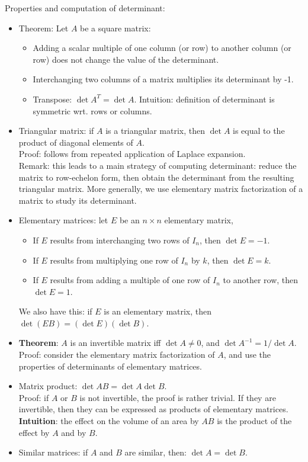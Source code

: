 \documentclass{report}
\begin{document}
Properties and computation of determinant: 
\begin{itemize}
\item Theorem: Let $A$ be a square matrix: 
\begin{itemize}
	\item Adding a scalar multiple of one column (or row) to another column (or row) does not change the value of the determinant.

	\item Interchanging two columns of a matrix multiplies its determinant by -1.

	\item Transpose: $\det A^T = \det A$. Intuition: definition of determinant is symmetric wrt. rows or columns. 
\end{itemize}

\item Triangular matrix: if $A$ is a triangular matrix, then $\det A$ is equal to the product of diagonal elements of $A$. \\
Proof: follows from repeated application of Laplace expansion. \\
Remark: this leads to a main strategy of computing determinant: reduce the matrix to row-echelon form, then obtain the determinant from the resulting triangular matrix. More generally, we use elementary matrix factorization of a matrix to study its determinant. 

\item Elementary matrices: let $E$ be an $n \times n$ elementary matrix,
\begin{itemize}
	\item If $E$ results from interchanging two rows of $I_n$, then $\det E = -1$. 
	\item If $E$ results from multiplying one row of $I_n$ by $k$, then $\det E = k$. 
	\item If $E$ results from adding a multiple of one row of $I_n$ to another row, then $\det E = 1$.
\end{itemize}
We also have this: if $E$ is an elementary matrix, then $\det(EB) = (\det E) (\det B)$. 

\item \textbf{Theorem}: $A$ is an invertible matrix iff $\det A \neq 0$, and $\det A^{-1} = 1 / \det A$. \\
Proof: consider the elementary matrix factorization of $A$, and use the properties of determinants of elementary matrices. 

\item Matrix product: $\det AB = \det A \det B$. \\
Proof: if $A$ or $B$ is not invertible, the proof is rather trivial. If they are invertible, then they can be expressed as products of elementary matrices. \\
\textbf{Intuition}: the effect on the volume of an area by $AB$ is the product of the effect by $A$ and by $B$. 

\item Similar matrices: if $A$ and $B$ are similar, then: $\det A = \det B$. 
\end{itemize}
\end{document}
